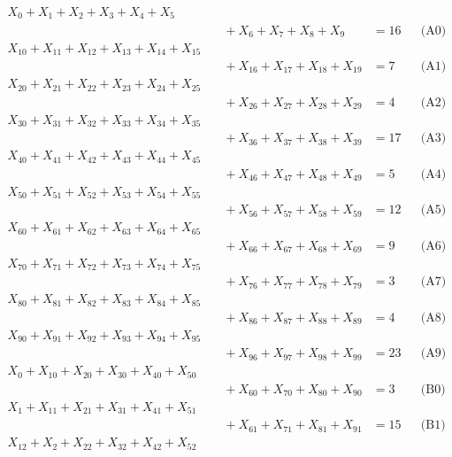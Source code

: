 \documentclass[a4paper,10pt]{article}
\begin{document}
\allowdisplaybreaks
{\small\begin{align}
X_{0} + X_{1} + X_{2} + X_{3} + X_{4} + X_{5} \\[0.5ex]
&\quad  + X_{6} + X_{7} + X_{8} + X_{9} &= 16 && \text{(A0)} \\
X_{10} + X_{11} + X_{12} + X_{13} + X_{14} + X_{15} \\[0.5ex]
&\quad  + X_{16} + X_{17} + X_{18} + X_{19} &= 7 && \text{(A1)} \\
X_{20} + X_{21} + X_{22} + X_{23} + X_{24} + X_{25} \\[0.5ex]
&\quad  + X_{26} + X_{27} + X_{28} + X_{29} &= 4 && \text{(A2)} \\
X_{30} + X_{31} + X_{32} + X_{33} + X_{34} + X_{35} \\[0.5ex]
&\quad  + X_{36} + X_{37} + X_{38} + X_{39} &= 17 && \text{(A3)} \\
X_{40} + X_{41} + X_{42} + X_{43} + X_{44} + X_{45} \\[0.5ex]
&\quad  + X_{46} + X_{47} + X_{48} + X_{49} &= 5 && \text{(A4)} \\
X_{50} + X_{51} + X_{52} + X_{53} + X_{54} + X_{55} \\[0.5ex]
&\quad  + X_{56} + X_{57} + X_{58} + X_{59} &= 12 && \text{(A5)} \\
X_{60} + X_{61} + X_{62} + X_{63} + X_{64} + X_{65} \\[0.5ex]
&\quad  + X_{66} + X_{67} + X_{68} + X_{69} &= 9 && \text{(A6)} \\
X_{70} + X_{71} + X_{72} + X_{73} + X_{74} + X_{75} \\[0.5ex]
&\quad  + X_{76} + X_{77} + X_{78} + X_{79} &= 3 && \text{(A7)} \\
X_{80} + X_{81} + X_{82} + X_{83} + X_{84} + X_{85} \\[0.5ex]
&\quad  + X_{86} + X_{87} + X_{88} + X_{89} &= 4 && \text{(A8)} \\
X_{90} + X_{91} + X_{92} + X_{93} + X_{94} + X_{95} \\[0.5ex]
&\quad  + X_{96} + X_{97} + X_{98} + X_{99} &= 23 && \text{(A9)} \\
X_{0} + X_{10} + X_{20} + X_{30} + X_{40} + X_{50} \\[0.5ex]
&\quad  + X_{60} + X_{70} + X_{80} + X_{90} &= 3 && \text{(B0)} \\
X_{1} + X_{11} + X_{21} + X_{31} + X_{41} + X_{51} \\[0.5ex]
&\quad  + X_{61} + X_{71} + X_{81} + X_{91} &= 15 && \text{(B1)} \\
X_{12} + X_{2} + X_{22} + X_{32} + X_{42} + X_{52} \\[0.5ex]

\end{align}}
\end{document}
